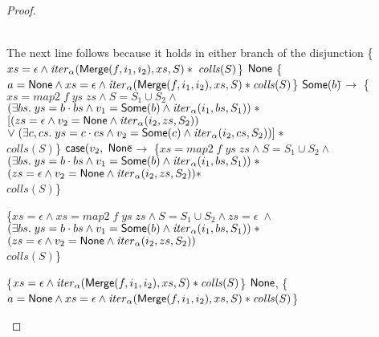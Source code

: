 \begin{proof}
\begin{itemize}
\begin{specification}
\\ \> \>     The next line follows because it holds in either branch of the disjunction 
\nextline \> \{$xs = \epsilon \land \mathit{iter}_\alpha(\mathsf{Merge}(f, i_1, i_2), xs, S)
               * \; \mathit{colls}(S)$\}
\nextline \> $\mathsf{None}$ 
\nextline \> \{$a = \mathsf{None} \land xs = \epsilon \land \mathit{iter}_\alpha(\mathsf{Merge}(f, i_1, i_2), xs, S)
               * \mathit{colls}(S) $\}
\nextline \;\;\;$\mathsf{Some}(b)$\=$ \to $ 
\nextline \> \{$xs = \mathit{map2}\;f\;ys\;zs \land 
                  S = S_1 \cup S_2 \land$ 
\\ \> \>\;\;    $(\exists bs.\; ys = b\cdot bs \land v_1 = \mathsf{Some}(b) \land 
                                \mathit{iter}_\alpha(i_1, bs, S_1)) \;*$ 
\\ \> \>\;     $[(zs = \epsilon \land v_2 = \mathsf{None} \land \mathit{iter}_\alpha(i_2, zs, S_2))$ 
\\ \> \>\;\;    $\vee\; (\exists c, cs.\; ys = c\cdot cs \land v_2 = \mathsf{Some}(c) \land 
                                \mathit{iter}_\alpha(i_2, cs, S_2))] \;*$ 
\\ \> \>\;     $\mathit{colls}(S)$\}
\nextline \> $\mathsf{case}(v_2,$ 
\nextline \> \;\;\; $\mathsf{None}$\=$\to$ 
\nextline \> \> \{$xs = \mathit{map2}\;f\;ys\;zs \land 
                  S = S_1 \cup S_2 \land$ 
\\ \> \> \>\;\;    $(\exists bs.\; ys = b\cdot bs \land v_1 = \mathsf{Some}(b) \land 
                                \mathit{iter}_\alpha(i_1, bs, S_1)) \;*$
\\ \> \> \>\;     $(zs = \epsilon \land v_2 = \mathsf{None} \land \mathit{iter}_\alpha(i_2, zs, S_2)) *$ 
\\ \> \> \>\;     $\mathit{colls}(S)$\}

\nextline \> \> \{$xs = \epsilon \land xs = \mathit{map2}\;f\;ys\;zs \land 
                  S = S_1 \cup S_2 \land zs = \epsilon \;\land$ 
\\ \> \> \>\;\;    $(\exists bs.\; ys = b\cdot bs \land v_1 = \mathsf{Some}(b) \land 
                                \mathit{iter}_\alpha(i_1, bs, S_1)) \;*$
\\ \> \> \>\;     $(zs = \epsilon \land v_2 = \mathsf{None} \land \mathit{iter}_\alpha(i_2, zs, S_2))$ 
\\ \> \> \>\;     $\mathit{colls}(S)$\}

\nextline \> \> \{$xs = \epsilon \land \mathit{iter}_\alpha(\mathsf{Merge}(f, i_1, i_2), xs, S) * 
                   \mathit{colls}(S)$\}
\nextline \> \> $\mathsf{None}$,
\nextline \> \> \{$a = \mathsf{None} \land xs = \epsilon \land \mathit{iter}_\alpha(\mathsf{Merge}(f, i_1, i_2), xs, S) * 
                   \mathit{colls}(S)$\}


\end{specification}
\end{itemize}
\end{proof}
